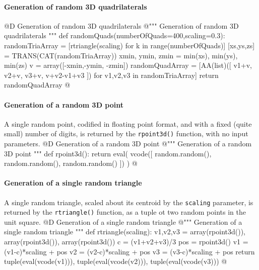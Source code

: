 \documentclass[11pt,oneside]{article}    %
\begin{document}
\paragraph{Generation of random 3D quadrilaterals}

@D Generation of random 3D quadrilaterals
@{""" Generation of random 3D quadrilaterals """
def randomQuads(numberOfQuads=400,scaling=0.3):
    randomTriaArray = [rtriangle(scaling) for k in range(numberOfQuads)]
    [xs,ys,zs] = TRANS(CAT(randomTriaArray))
    xmin, ymin, zmin = min(xs), min(ys), min(zs)
    v = array([-xmin,-ymin, -zmin])
    randomQuadArray = [AA(list)([ v1+v, v2+v, v3+v, v+v2-v1+v3 ]) for v1,v2,v3 in randomTriaArray]
    return randomQuadArray
@}


\paragraph{Generation of a random 3D point}
A single random point, codified in floating point format, and with a fixed (quite small) number of digits, is returned by the \texttt{rpoint3d()} function, with no input parameters.
@D Generation of a random 3D point
@{""" Generation of a random 3D point """
def rpoint3d():
    return eval( vcode([ random.random(), random.random(), random.random() ]) )
@}
    
\paragraph{Generation of a single random triangle}
A single random triangle, scaled about its centroid by the \texttt{scaling} parameter, is returned by the \texttt{rtriangle()} function, as a tuple ot two random points in the unit square.
@D Generation of a single random triangle
@{""" Generation of a single random triangle """
def rtriangle(scaling):
    v1,v2,v3 = array(rpoint3d()), array(rpoint3d()), array(rpoint3d())
    c = (v1+v2+v3)/3
    pos = rpoint3d()
    v1 = (v1-c)*scaling + pos
    v2 = (v2-c)*scaling + pos
    v3 = (v3-c)*scaling + pos
    return tuple(eval(vcode(v1))), tuple(eval(vcode(v2))), tuple(eval(vcode(v3)))
@}
    
\end{document}
